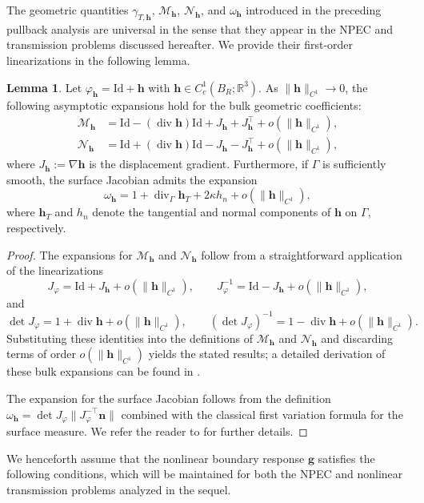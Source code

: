 \documentclass[12pt,reqno]{amsart}
\theoremstyle{definition}
\newtheorem{lemm}[theo]{Lemma}
\numberwithin{equation}{section}
\begin{document}
The geometric quantities $\gamma_{T,\mathbf{h}}$, $\mathcal{M}_{\mathbf{h}}$, $\mathcal{N}_{\mathbf{h}}$, and $\omega_{\mathbf{h}}$ introduced in the preceding pullback analysis are universal in the sense that they appear in the NPEC and transmission problems discussed hereafter. We provide their first-order linearizations in the following lemma.

\begin{lemm}\label{le:positive}
Let $\varphi_{\mathbf{h}} = \mathrm{Id} + \mathbf{h}$ with $\mathbf{h} \in C_c^1(B_R; \mathbb{R}^3)$. As $\|\mathbf{h}\|_{C^1} \to 0$, the following asymptotic expansions hold for the bulk geometric coefficients:
\begin{align*}
\mathcal{M}_{\mathbf{h}} &= \mathrm{Id} - (\operatorname{div}\mathbf{h})\mathrm{Id} + J_{\mathbf{h}} + J_{\mathbf{h}}^{\top} + o(\|\mathbf{h}\|_{C^1}), \\
\mathcal{N}_{\mathbf{h}} &= \mathrm{Id} + (\operatorname{div}\mathbf{h})\mathrm{Id} - J_{\mathbf{h}} - J_{\mathbf{h}}^{\top} + o(\|\mathbf{h}\|_{C^1}),
\end{align*}
where $J_{\mathbf{h}} := \nabla\mathbf{h}$ is the displacement gradient. Furthermore, if $\Gamma$ is sufficiently smooth, the surface Jacobian admits the expansion
\[
\omega_{\mathbf{h}} = 1 + \operatorname{div}_\Gamma\mathbf{h}_T + 2\kappa h_n + o(\|\mathbf{h}\|_{C^1}),
\]
where $\mathbf{h}_T$ and $h_n$ denote the tangential and normal components of $\mathbf{h}$ on $\Gamma$, respectively.
\end{lemm}


\begin{proof}
The expansions for $\mathcal{M}_{\mathbf{h}}$ and $\mathcal{N}_{\mathbf{h}}$ follow from a straightforward application of the linearizations
\[
J_{\varphi} = \mathrm{Id} + J_{\mathbf{h}} + o(\|\mathbf{h}\|_{C^1}), \qquad J_{\varphi}^{-1} = \mathrm{Id} - J_{\mathbf{h}} + o(\|\mathbf{h}\|_{C^1}),
\]
and
\[
\det J_{\varphi} = 1 + \operatorname{div} \mathbf{h} + o(\|\mathbf{h}\|_{C^1}), \qquad (\det J_{\varphi})^{-1} = 1 - \operatorname{div} \mathbf{h} + o(\|\mathbf{h}\|_{C^1}).
\]
Substituting these identities into the definitions of $\mathcal{M}_{\mathbf{h}}$ and $\mathcal{N}_{\mathbf{h}}$ and discarding terms of order $o(\|\mathbf{h}\|_{C^1})$ yields the stated results; a detailed derivation of these bulk expansions can be found in \cite{Hettlich2012}.

The expansion for the surface Jacobian follows from the definition $\omega_{\mathbf{h}} = \det J_{\varphi} \|J_{\varphi}^{-\top} \mathbf{n}\|$ combined with the classical first variation formula for the surface measure. We refer the reader to \cite[Chapter~9]{Delfour2011} for further details.
\end{proof}
We henceforth assume that the nonlinear boundary response $\mathbf{g}$ satisfies the following conditions, which will be maintained for both the NPEC and nonlinear transmission problems analyzed in the sequel.
\end{document}
